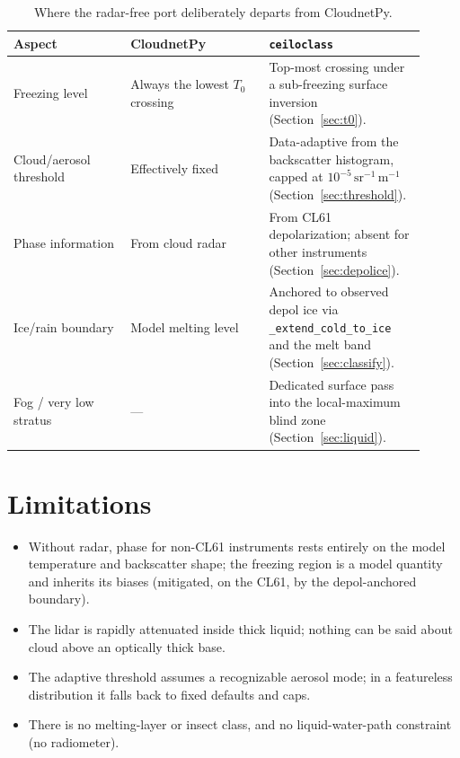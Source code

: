 \documentclass[11pt,a4paper]{article}
\newcommand{\betau}{\ensuremath{\mathrm{sr^{-1}\,m^{-1}}}}
\newcommand{\Tzero}{\ensuremath{T_0}}
\newcommand{\code}[1]{\texttt{#1}}
\begin{document}
\begin{table}[h]
\centering
\small
\renewcommand{\arraystretch}{1.25}
\begin{tabular}{@{}p{0.27\linewidth} p{0.32\linewidth} p{0.32\linewidth}@{}}
\toprule
Aspect & CloudnetPy & \code{ceiloclass} \\
\midrule
Freezing level &
  Always the lowest \Tzero{} crossing &
  Top-most crossing under a sub-freezing surface inversion
  (Section~\ref{sec:t0}). \\
Cloud/aerosol threshold &
  Effectively fixed &
  Data-adaptive from the backscatter histogram, capped at $10^{-5}\,\betau$
  (Section~\ref{sec:threshold}). \\
Phase information &
  From cloud radar &
  From CL61 depolarization; absent for other instruments
  (Section~\ref{sec:depolice}). \\
Ice/rain boundary &
  Model melting level &
  Anchored to observed depol ice via \code{\_extend\_cold\_to\_ice} and the melt
  band (Section~\ref{sec:classify}). \\
Fog / very low stratus &
  --- &
  Dedicated surface pass into the local-maximum blind zone
  (Section~\ref{sec:liquid}). \\
\bottomrule
\end{tabular}
\caption{Where the radar-free port deliberately departs from CloudnetPy.}
\end{table}

\section{Limitations}

\begin{itemize}[nosep]
  \item Without radar, phase for non-CL61 instruments rests entirely on the model
        temperature and backscatter shape; the freezing region is a model
        quantity and inherits its biases (mitigated, on the CL61, by the
        depol-anchored boundary).
  \item The lidar is rapidly attenuated inside thick liquid; nothing can be said
        about cloud above an optically thick base.
  \item The adaptive threshold assumes a recognizable aerosol mode; in a
        featureless distribution it falls back to fixed defaults and caps.
  \item There is no melting-layer or insect class, and no liquid-water-path
        constraint (no radiometer).
\end{itemize}
\end{document}
